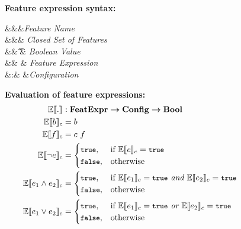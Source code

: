\begin{figure}
%
\textbf{Feature expression syntax:}
\begin{syntax}
\synDef \fName \fSet &&&\textit{Feature Name}\\
\synDef \features {\settype \fSet} &&& \textit{Closed Set of Features}\\
\synDef \bTag \bSet &\eqq& \t \myOR \f & \textit{Boolean Value}\\
\synDef \dimMeta \ffSet &\eqq& \bTag \myOR \fName \myOR \neg \dimMeta \myOR \dimMeta \wedge \dimMeta \myOR \dimMeta \vee \dimMeta & \textit{Feature Expression}\\
\synDef \config \confSet &:& \fSet \totype \bSet &\textit{Configuration}
\end{syntax}

\medskip
\textbf{Evaluation of feature expressions:}
\begin{alignat*}{1}
\fSem [] . &: \ffSet \totype \confSet \totype \bSet\\
\fSem \bTag &= \bTag\\
\fSem \fName &= \config \ \fName\\
\fSem {\neg \dimMeta} &= 
	\begin{cases}
	  \t, &\If \fSem \dimMeta = \t\\
	  \f, &\Otherwise
	\end{cases}\\
\fSem {\annd \dimMeta} &= 
	\begin{cases}
	  \t, &\If \fSem {\dimMeta_1} = \t \textit{ and } \fSem {\dimMeta_2} = \t\\
	  \f, &\Otherwise
	\end{cases}\\
\fSem {\orr \dimMeta} &= 
	\begin{cases}
	  \t, &\If \fSem {\dimMeta_1} = \t \textit{ or } \fSem {\dimMeta_2} = \t\\
	  \f, &\Otherwise
	\end{cases}
\end{alignat*}


\end{figure}
